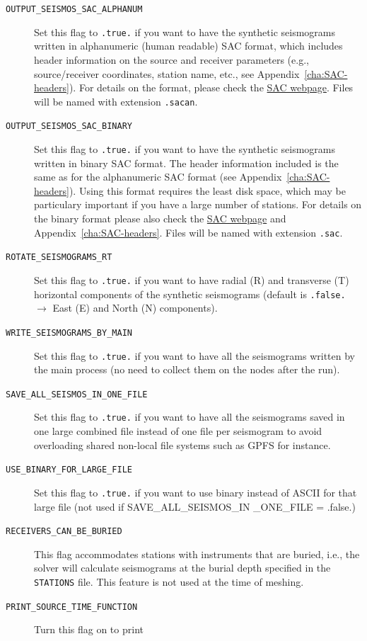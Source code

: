 \begin{description}
%
\item [{\texttt{OUTPUT\_SEISMOS\_SAC\_ALPHANUM}}] Set this flag to \texttt{.true.}
if you want to have the synthetic seismograms written in alphanumeric
(human readable) SAC format, which includes header information on
the source and receiver parameters (e.g., source/receiver coordinates,
station name, etc., see Appendix~\ref{cha:SAC-headers}). For details on the format, please check the \href{http://www.iris.edu/software/sac/}{SAC webpage}. Files will be named with extension \texttt{.sacan}.
%
\item [{\texttt{OUTPUT\_SEISMOS\_SAC\_BINARY}}] Set this flag to \texttt{.true.}
if you want to have the synthetic seismograms written in binary SAC
format. The header information included is the same as for the alphanumeric
SAC format (see Appendix~\ref{cha:SAC-headers}). Using this format requires the least disk space, which may be particulary important if you have a large number of stations.
For details on the binary format please also check the \href{http://www.iris.edu/software/sac/}{SAC webpage} and Appendix~\ref{cha:SAC-headers}. Files will be named with extension \texttt{.sac}.
%
\item [{\texttt{ROTATE\_SEISMOGRAMS\_RT}}] Set this flag to \texttt{.true.}
if you want to have radial (R) and transverse (T) horizontal components
of the synthetic seismograms (default is \texttt{.false.} $\rightarrow$
East (E) and North (N) components).
%
\item [{\texttt{WRITE\_SEISMOGRAMS\_BY\_MAIN}}] Set this flag to \texttt{.true.}
if you want to have all the seismograms written by the main process (no
need to collect them on the nodes after the run).
%
\item [{\texttt{SAVE\_ALL\_SEISMOS\_IN\_ONE\_FILE}}] Set this flag to \texttt{.true.}
if you want to have all the seismograms saved in one large combined
file instead of one file per seismogram to avoid overloading shared
non-local file systems such as GPFS for instance.
%
\item [{\texttt{USE\_BINARY\_FOR\_LARGE\_FILE}}] Set this flag to \texttt{.true.}
if you want to use binary instead of ASCII for that large file (not
used if SAVE\_ALL\_SEISMOS\_IN \_ONE\_FILE = .false.)
%
\item [{\texttt{RECEIVERS\_CAN\_BE\_BURIED}}] This flag accommodates stations
with instruments that are buried, i.e., the solver will calculate
seismograms at the burial depth specified in the \texttt{STATIONS}
file. This feature is not used at the time of meshing.
%
\item [{\texttt{PRINT\_SOURCE\_TIME\_FUNCTION}}] Turn this flag on to print

\end{description}
